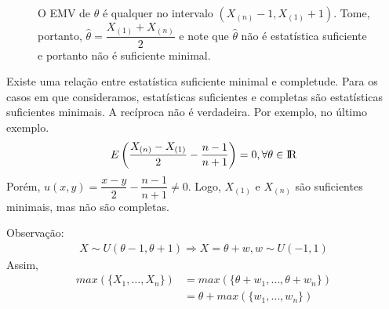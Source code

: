 \documentclass[12pt]{beamer}
\begin{document}
\begin{frame}[fragile]{}
\begin{block}{}
\begin{figure}[H]
\begin{minipage}[t]{0.5\linewidth}
\centering
{}
\end{minipage}%
\begin{minipage}[t]{0.5\linewidth}
O EMV de $\theta$ é qualquer no intervalo $(X_{(n)}-1,X_{(1)}+1).$ Tome, portanto, $\hat{\theta}=\dfrac{X_{(1)}+X_{(n)}}{2}$ e note que $\hat{\theta}$ não é estatística suficiente e portanto não é suficiente minimal.
\end{minipage}
\end{figure}
\end{block}
\end{frame}

\begin{frame}{}
\begin{block}{}
\justifying
Existe uma relação entre estatística suficiente minimal e completude. Para os casos em que consideramos, estatísticas suficientes e completas são estatísticas suficientes minimais. A recíproca não é verdadeira. Por exemplo, no último exemplo.
\begin{align*}
    E\left(\dfrac{X_{(n)}-X_{(1)}}{2}-\dfrac{n-1}{n+1}\right)=0, \forall \theta\in\rm I\!R
\end{align*}
Porém, $u(x,y)=\dfrac{x-y}{2}-\dfrac{n-1}{n+1}\neq 0.$ Logo, $X_{(1)}$ e $X_{(n)}$ são suficientes minimais, mas não são completas.
\end{block}
\end{frame}

\begin{frame}{}
\begin{block}{Observação:}
\justifying
\begin{align*}
    X\sim U(\theta-1,\theta+1)\Rightarrow X=\theta+w, w\sim U(-1,1)
\end{align*}
Assim, 
\begin{align*}
    max(\{X_{1},\ldots,X_{n}\})&=max(\{\theta+w_{1},\ldots,\theta+w_{n}\})\\
    &=\theta+max(\{w_{1},\ldots,w_{n}\})
\end{align*}
\end{block}
\end{frame}
\end{document}
